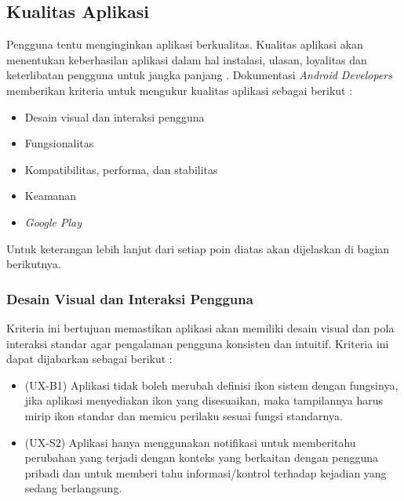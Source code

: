 \subsection{Kualitas Aplikasi}
Pengguna tentu menginginkan aplikasi berkualitas. Kualitas aplikasi akan menentukan keberhasilan aplikasi dalam hal instalasi, ulasan, loyalitas dan keterlibatan pengguna untuk jangka panjang \cite{androiddesign}. Dokumentasi \textit{Android Developers} memberikan kriteria untuk mengukur kualitas aplikasi sebagai berikut :
\begin{itemize}
    \item Desain visual dan interaksi pengguna
    \item Fungsionalitas
    \item Kompatibilitas, performa, dan stabilitas
    \item Keamanan   
    \item \textit{Google Play}
\end{itemize}
Untuk keterangan lebih lanjut dari setiap poin diatas akan dijelaskan di bagian berikutnya.

\subsubsection{Desain Visual dan Interaksi Pengguna}
Kriteria ini bertujuan memastikan aplikasi akan memiliki desain visual dan pola interaksi standar agar pengalaman pengguna konsisten dan intuitif\cite{androiddev}. Kriteria ini dapat dijabarkan sebagai berikut : 
\begin{itemize}
    \item (UX-B1) Aplikasi tidak boleh merubah definisi ikon sistem dengan fungsinya, jika aplikasi menyediakan ikon yang disesuaikan, maka tampilannya harus mirip ikon standar dan memicu perilaku sesuai fungsi standarnya. 
    \item (UX-S2) Aplikasi hanya menggunakan notifikasi untuk memberitahu perubahan yang terjadi dengan konteks yang berkaitan dengan pengguna pribadi dan untuk memberi tahu informasi/kontrol terhadap kejadian yang sedang berlangsung.
\end{itemize}

